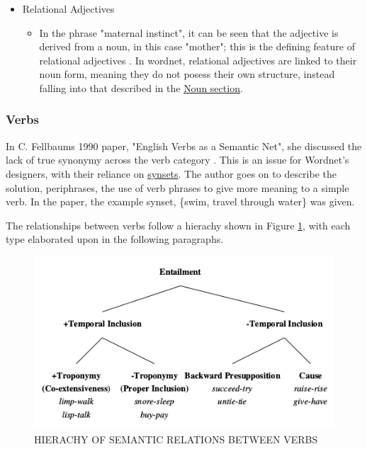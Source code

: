 \documentclass[]{article}
\begin{document}
\begin{itemize}
	\item Relational Adjectives
	\begin{itemize}
		\item In the phrase "maternal instinct", it can be seen that the adjective is derived from a noun, in this case "mother"; this is the defining feature of relational adjectives \cite{WN3Adjectives}. In wordnet, relational adjectives are linked to their noun form, meaning they do not posess their own structure, instead falling into that described in the \hyperref[Nouns]{Noun section}.
	\end{itemize}		
		
	
\end{itemize}


\subsubsection{Verbs}
\label{Verbs}
In C. Fellbaums 1990 paper, "English Verbs as a Semantic Net", she discussed the lack of true synonymy across the verb category \cite{WN4Verbs}. This is an issue for Wordnet's designers, with their reliance on \hyperref[Synsets]{synsets}. The author goes on to describe the solution, periphrases, the use of verb phrases to give more meaning to a simple verb. In the paper, the example synset, \{swim, travel through water\} was given\cite{WN4Verbs}. 

The relationships between verbs follow a hierachy shown in Figure \ref{fig:WN4Verbs_pp15}, with each type elaborated upon in the following paragraphs.

\begin{figure}[h]
	\includegraphics[scale=0.7]{WN4Verbs_pp15.png}
	\caption{HIERACHY OF SEMANTIC RELATIONS BETWEEN VERBS \cite[p.~15]{WN4Verbs}}
	\label{fig:WN4Verbs_pp15}
\end{figure}
\end{document}

